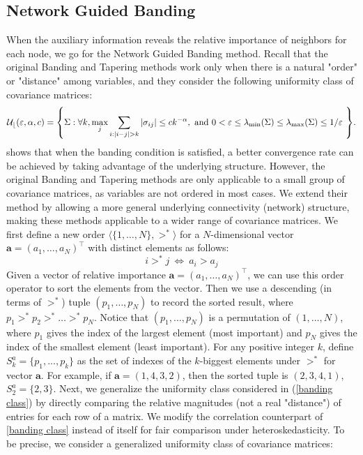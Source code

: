\subsection{Network Guided  Banding}{\label{framework2}}
When the auxiliary information reveals the relative importance of neighbors for each node, we go for the Network Guided Banding method. 
Recall that the original Banding and Tapering methods work only when there is a natural "order" or "distance" among variables, and they consider the following uniformity class of covariance matrices: 
\begin{equation}
	\mathcal{U_b}(\varepsilon, \alpha, c) = \Bqty{ \Sigma: \forall k, \max_j \sum_{i: \abs{i-j}>k} \abs{\sigma_{ij}} \leq c k^{-\alpha}, 
    \mbox{ and } 0<\varepsilon \leq \lambda_{\min}(\Sigma) \leq \lambda_{\max} (\Sigma)  \leq 1/\varepsilon \ }.
    \label{banding class}
\end{equation}
\cite{bickel2008covariance} shows that when the banding condition is satisfied, a better convergence rate can be achieved by taking advantage of the underlying structure. However, the original Banding and Tapering methods are only applicable to a small group of covariance matrices, as variables are not ordered in most cases. We extend their method by allowing a more general underlying connectivity (network) structure, making these methods applicable to a wider range of covariance matrices. We first define a new order $\langle \{ 1,\dots,N \} , >^* \rangle$ for a $N$-dimensional vector $\boldsymbol{a}=(a_1,\dots,a_N)^{\intercal}$ with distinct elements as follows:
\begin{equation}
	i >^* j \ \Leftrightarrow \
        a_i > a_j 
\end{equation}
Given a vector of relative importance $\boldsymbol{a}=(a_1,\dots,a_N)^{\intercal}$, we can use this order operator to sort the elements from the vector. Then we use a descending (in terms of $>^*$) tuple $(p_1, \dots, p_N)$ to record the sorted result, where $p_1 >^* p_2 >^* \dots >^* p_N $. Notice that $(p_1, \dots, p_N)$ is a permutation of $(1, \dots, N)$, where $p_1$ gives the index of the largest element (most important) and $p_N$ gives the index of the smallest element (least important). For any positive integer $k$, define $S^a_k = \{ p_1,...,p_k\} $ as the set of indexes of the $k$-biggest elements under $>^*$ for vector $\boldsymbol{a}$. For example, if $\boldsymbol{a} = (1, 4, 3 , 2)$, then the sorted tuple is $(2, 3, 4, 1)$, $S^a_2 = \{2, 3\}$. Next, we generalize the uniformity class considered in \cite{bickel2008regularized} (\autoref{banding class}) by directly comparing the relative magnitudes (not a real "distance") of entries for each row of a matrix. We modify the correlation counterpart of \autoref{banding class} instead of itself for fair comparison under heteroskedasticity. To be precise, we consider a generalized uniformity class of covariance matrices: 
